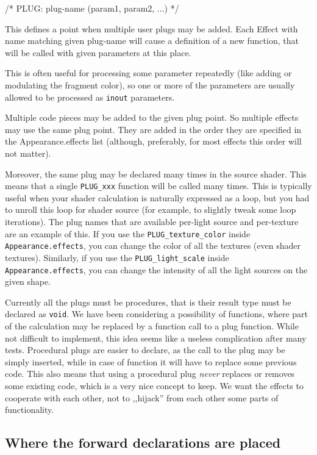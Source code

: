 \documentclass{acmsiggraph}                     %
\newenvironment{mycode}
{\begin{mycodecore}}
{\end{mycodecore}
\vspace{-0.1in}}
\begin{document}
\begin{mycode}
/* PLUG: plug-name (param1, param2, ...) */
\end{mycode}

This defines a point when multiple user plugs may be added. Each
Effect with name matching given plug-name will cause a
definition of a new function, that will be called with given parameters
at this place.

This is often useful for processing some parameter
repeatedly (like adding or modulating the fragment color),
so one or more of the parameters are usually allowed to be processed
as \texttt{inout} parameters.

Multiple code pieces may be added to the given plug point.
So multiple effects may use the same plug point. They are added
in the order they are specified in the Appearance.effects list
(although, preferably, for most effects this order will not matter).

Moreover, the same plug may be declared many times in the source shader.
This means that a single \texttt{PLUG\_xxx} function will be called
many times. This is typically useful when your shader calculation is naturally
expressed as a loop, but you had to unroll this loop for shader source
(for example, to slightly tweak some loop iterations).
The plug names that are available per-light source and per-texture
are an example of this. If you use the \texttt{PLUG\_texture\_color}
inside \texttt{Appearance.effects}, you can change the color of all
the textures (even shader textures).
Similarly, if you use the \texttt{PLUG\_light\_scale}
inside \texttt{Appearance.effects}, you can change the intensity
of all the light sources on the given shape.

Currently all the plugs must be procedures, that is their result type
must be declared as \texttt{void}. We have been considering
a possibility of functions, where part of the calculation may be replaced
by a function call to a plug function. While not difficult to implement,
this idea seems like a useless complication after many tests.
Procedural plugs are easier to declare, as the call to the plug
may be simply inserted, while in case of function it will have to replace
some previous code. This also means that using a procedural plug
\textit{never} replaces or removes some existing code, which is a very nice
concept to keep. We want the effects to cooperate with each other,
not to ,,hijack'' from each other some parts of functionality.

\subsection{Where the forward declarations are placed}
\end{document}
